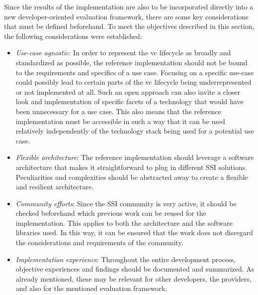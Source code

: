     Since the results of the implementation are also to be incorporated directly into a new developer-oriented evaluation framework, there are some key considerations that must be defined beforehand. To meet the objectives described in this section, the following considerations were established:
    \begin{itemize}
        \item \textit{Use-case agnostic}: In order to represent the \ac{vc} lifecycle as broadly and standardized as possible, the reference implementation should not be bound to the requirements and specifics of a use case. Focusing on a specific use-case could possibly lead to certain parts of the \ac{vc} lifecycle being underrepresented or not implemented at all. Such an open approach can also invite a closer look and implementation of specific facets of a technology that would have been unnecessary for a use case. This also means that the reference implementation must be accessible in such a way that it can be used relatively independently of the technology stack being used for a potential use case.
        \item \textit{Flexible architecture}: The reference implementation should leverage a software architecture that makes it straightforward to plug in different \ac{SSI} solutions. Peculiarities and complexities should be abstracted away to create a flexible and resilient architecture. 
        \item \textit{Community efforts}: Since the \ac{SSI} community is very active, it should be checked beforehand which previous work can be reused for the implementation. This applies to both the architecture and the software libraries used. In this way, it can be ensured that the work does not disregard the considerations and requirements of the community.
        \item \textit{Implementation experience}: Throughout the entire development process, objective experiences and findings should be documented and summarized. As already mentioned, these may be relevant for other developers, the providers, and also for the mentioned evaluation framework.
    \end{itemize}
    
